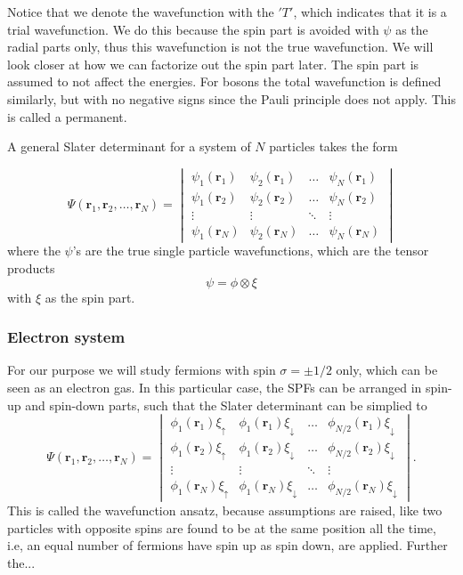 Notice that we denote the wavefunction with the $'T'$, which indicates that it is a trial wavefunction. We do this because the spin part is avoided with $\psi$ as the radial parts only, thus this wavefunction is not the true wavefunction. We will look closer at how we can factorize out the spin part later. The spin part is assumed to not affect the energies. For bosons the total wavefunction is defined similarly, but with no negative signs since the Pauli principle does not apply. This is called a permanent. 

A general Slater determinant for a system of $N$ particles takes the form

\begin{equation}
\Psi(\boldsymbol{r}_1,\boldsymbol{r}_2,\hdots,\boldsymbol{r}_N)=
\begin{vmatrix}
\psi_1(\boldsymbol{r}_1) & \psi_2(\boldsymbol{r}_1) & \hdots & \psi_N(\boldsymbol{r}_1)\\
\psi_1(\boldsymbol{r}_2) & \psi_2(\boldsymbol{r}_2) & \hdots & \psi_N(\boldsymbol{r}_2)\\
\vdots & \vdots & \ddots & \vdots \\
\psi_1(\boldsymbol{r}_N) & \psi_2(\boldsymbol{r}_N) & \hdots & \psi_N(\boldsymbol{r}_N)
\end{vmatrix}
\end{equation}
where the $\psi$'s are the true single particle wavefunctions, which are the tensor products 
\begin{equation}
\psi=\phi\otimes\xi
\end{equation}
with $\xi$ as the spin part. 

\subsubsection{Electron system} \label{subsubsec:electronsystem}
For our purpose we will study fermions with spin $\sigma=\pm 1/2$ only, which can be seen as an electron gas. In this particular case, the SPFs can be arranged in spin-up and spin-down parts, such that the Slater determinant can be simplied to 
\begin{equation}
\Psi(\boldsymbol{r}_1,\boldsymbol{r}_2,\hdots,\boldsymbol{r}_N)=
\begin{vmatrix}
\phi_1(\boldsymbol{r}_1)\xi_{\uparrow} & \phi_1(\boldsymbol{r}_1)\xi_{\downarrow} & \hdots & \phi_{N/2}(\boldsymbol{r}_1)\xi_{\downarrow}\\
\phi_1(\boldsymbol{r}_2)\xi_{\uparrow} & \phi_1(\boldsymbol{r}_2)\xi_{\downarrow} & \hdots & \phi_{N/2}(\boldsymbol{r}_2)\xi_{\downarrow}\\
\vdots & \vdots & \ddots & \vdots \\
\phi_1(\boldsymbol{r}_N)\xi_{\uparrow} & \phi_1(\boldsymbol{r}_N)\xi_{\downarrow} & \hdots & \phi_{N/2}(\boldsymbol{r}_N)\xi_{\downarrow}
\end{vmatrix}.
\end{equation}
This is called the wavefunction ansatz, because assumptions are raised, like two particles with opposite spins are found to be at the same position all the time, i.e, an equal number of fermions have spin up as spin down, are applied. Further the...

